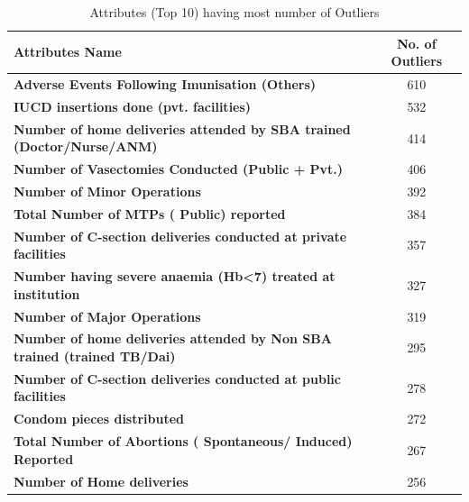 \documentclass[12pt]{article}
\begin{document}
\begin{table}[!h]
\caption{Attributes (Top 10) having most number of Outliers}
\hspace{-2cm}
\begin{tabular}{|l|c|}
\hline
\textbf{Attributes Name}                                                      & \textbf{No. of Outliers} \\ \hline
\textbf{Adverse Events Following Imunisation (Others)}                        & 610        \\
\textbf{IUCD insertions done (pvt. facilities)}                               & 532                         \\
\textbf{Number of home deliveries attended by SBA trained (Doctor/Nurse/ANM)} & 414                         \\
\textbf{Number of Vasectomies Conducted (Public + Pvt.)}                      & 406                         \\
\textbf{Number of Minor Operations}                                           & 392                         \\
\textbf{Total Number of MTPs ( Public) reported}                              & 384                         \\
\textbf{Number of C-section deliveries conducted at private facilities}       & 357                         \\
\textbf{Number having severe anaemia (Hb\textless{}7) treated at institution} & 327                         \\
\textbf{Number of Major Operations}                                           & 319                         \\
\textbf{Number of home deliveries attended by Non SBA trained (trained TB/Dai)} & 295 \\
\textbf{Number of C-section deliveries conducted at public facilities}        & 278                         \\
\textbf{Condom pieces distributed}                                            & 272                         \\
\textbf{Total Number of Abortions ( Spontaneous/ Induced) Reported}           & 267                         \\
\textbf{Number of Home deliveries}                                            & 256      \\ \hline                  
\end{tabular}
\end{table}
 
\end{document}
